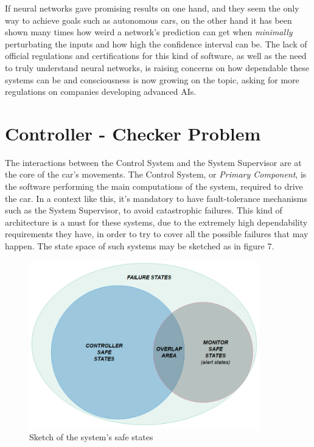 If neural networks gave promising results on one hand, and they seem the only way to achieve goals such as autonomous cars, on the other hand it has been shown many times how weird a network's prediction can get when \textsl{minimally} perturbating the inputs\cite{stupidnn} and how high the confidence interval can be.\cite{foolnn} The lack of official regulations and certifications for this kind of software, as well as the need to truly understand neural networks, is raising concerns on how dependable these systems can be and consciousness is now growing on the topic, asking for more regulations on companies developing advanced AIs.\cite{elonmusk}

\section{Controller - Checker Problem}


The interactions between the Control System and the System Supervisor are at the core of the car's movements. The Control System, or \textsl{Primary Component}, is the software performing the main computations of the system, required to drive the car. In a context like this, it's mandatory to have fault-tolerance mechanisms such as the System Supervisor, to avoid catastrophic failures. This kind of architecture is a must for these systems, due to the extremely high dependability requirements they have, in order to try to cover all the possible failures that may happen. The state space of such systems may be sketched as in figure 7.
\vspace{0.3cm}
\begin{figure}[h!]
	\includegraphics[width=\textwidth,height=7.3cm]{img/state-space.png}
	\caption{Sketch of the system's safe states}
\end{figure}
\newpage

